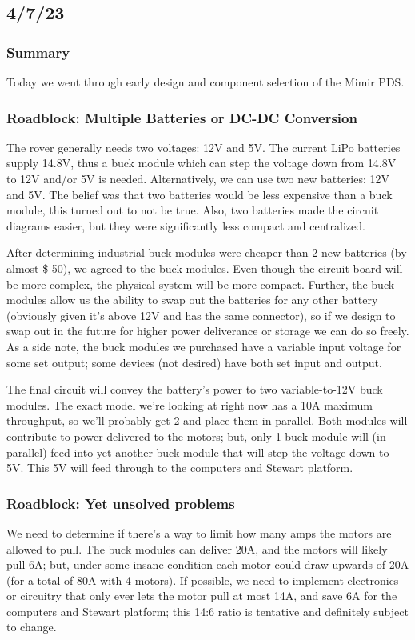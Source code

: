 \documentclass[a4paper, 10pt]{article}
\begin{document}
	\subsection{4/7/23}
		\subsubsection{Summary}
		Today we went through early design and component selection of the Mimir PDS. 
		
		\subsubsection{Roadblock: Multiple Batteries or DC-DC Conversion}
		The rover generally needs two voltages: 12V and 5V. The current LiPo batteries supply 14.8V, thus a buck module which can step the voltage down from 14.8V to 12V and/or 5V is needed. Alternatively, we can use two new batteries: 12V and 5V. The belief was that two batteries would be less expensive than a buck module, this turned out to not be true. Also, two batteries made the circuit diagrams easier, but they were significantly less compact and centralized.
		
		After determining industrial buck modules were cheaper than 2 new batteries (by almost \$ 50), we agreed to the buck modules. Even though the circuit board will be more complex, the physical system will be more compact. Further, the buck modules allow us the ability to swap out the batteries for any other battery (obviously given it's above 12V and has the same connector), so if we design to swap out in the future for higher power deliverance or storage we can do so freely. As a side note, the buck modules we purchased have a variable input voltage for some set output; some devices (not desired) have both set input and output.
		
		The final circuit will convey the battery's power to two variable-to-12V buck modules. The exact model we're looking at right now has a 10A maximum throughput, so we'll probably get 2 and place them in parallel. Both modules will contribute to power delivered to the motors; but, only 1 buck module will (in parallel) feed into yet another buck module that will step the voltage down to 5V. This 5V will feed through to the computers and Stewart platform.
		
		\subsubsection{Roadblock: Yet \textbf{unsolved} problems}
		We need to determine if there's a way to limit how many amps the motors are allowed to pull. The buck modules can deliver 20A, and the motors will likely pull 6A; but, under some insane condition each motor could draw upwards of 20A (for a total of 80A with 4 motors). If possible, we need to implement electronics or circuitry that only ever lets the motor pull at most 14A, and save 6A for the computers and Stewart platform; this 14:6 ratio is tentative and definitely subject to change.
		
\end{document}
